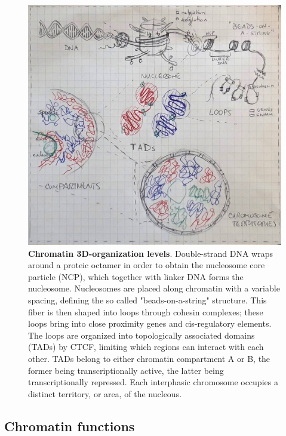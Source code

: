 \begin{figure}[ht]
  \centering
  \includegraphics[width=1\textwidth]{chromatin_organization.jpeg}
  \caption{\textbf{Chromatin 3D-organization levels}. Double-strand DNA wraps around a proteic octamer in order to obtain the nucleosome core particle (NCP), which together with linker DNA forms the nucleosome. Nucleosomes are placed along chromatin with a variable spacing, defining the so called "beads-on-a-string" structure. This fiber is then shaped into loops through cohesin complexes; these loops bring into close proximity genes and cis-regulatory elements. The loops are organized into topologically associated domains (TADs) by CTCF, limiting which regions can interact with each other. TADs belong to either chromatin compartment A or B, the former being transcriptionally active, the latter being transcriptionally repressed. Each interphasic chromosome occupies a distinct territory, or area, of the nucleous.}
  \label{fig:chromatin}
\end{figure}

\subsection{Chromatin functions}

